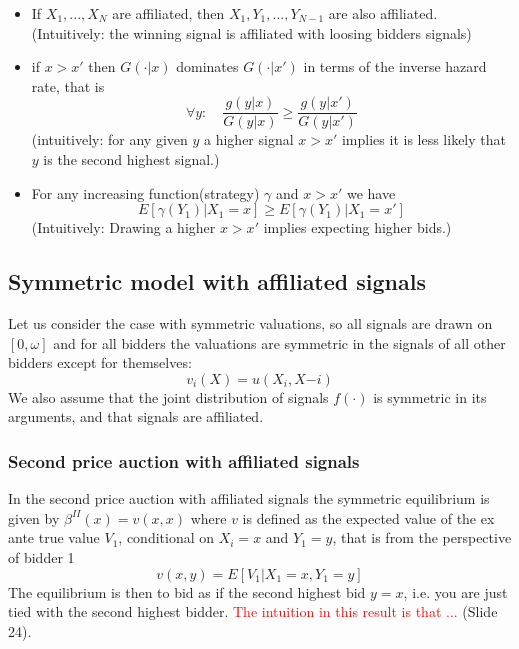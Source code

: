 \begin{itemize}
  \item If $X_1, ..., X_N$ are affiliated, then $X_1, Y_1, ..., Y_{N-1}$ are also affiliated. (Intuitively: the winning signal is affiliated with loosing bidders signals)
  \item if $x>x'$ then $G(\cdot|x)$ dominates $G(\cdot|x')$ in terms of the inverse hazard rate, that is
  \begin{equation}
    \forall y: \quad \frac{g(y|x)}{G(y|x)} \geq \frac{g(y|x')}{G(y|x')}
  \end{equation}
  (intuitively: for any given $y$ a higher signal $x>x'$ implies it is less likely that $y$ is the second highest signal.)
  \item For any increasing function(strategy) $\gamma$ and $x>x'$ we have
  \begin{equation}
    E[\gamma(Y_1)|X_1 = x] \geq E[\gamma(Y_1)|X_1 = x']
  \end{equation}
  (Intuitively: Drawing a higher $x>x'$ implies expecting higher bids.)
\end{itemize}

\subsection{Symmetric model with affiliated signals}
Let us consider the case with symmetric valuations, so all signals are drawn on $[0,\omega]$ and for all bidders the valuations are symmetric in the signals of all other bidders except for themselves:
\begin{equation}
  v_i(X) = u(X_i, X{-i})
\end{equation}
We also assume that the joint distribution of signals $f(\cdot)$ is symmetric in its arguments, and that signals are affiliated.

\subsubsection{Second price auction with affiliated signals}
In the second price auction with affiliated signals the symmetric equilibrium is given by $\beta^{II}(x)=v(x,x)$ where $v$ is defined as the expected value of the ex ante true value $V_1$, conditional on $X_i = x$ and $Y_1 = y$, that is from the perspective of bidder 1
\begin{equation}
  v(x,y) = E[V_1 | X_1=x, Y_1 = y]
\end{equation}
The equilibrium is then to bid as if the second highest bid $y=x$, i.e. you are just tied with the second highest bidder. \textcolor{red}{The intuition in this result is that ...} (Slide 24).

